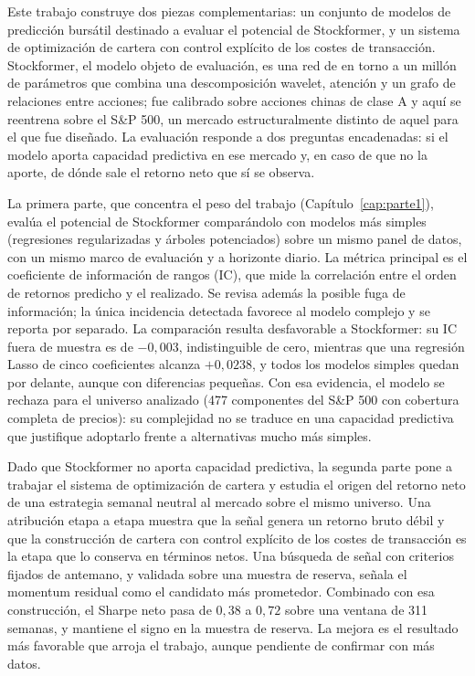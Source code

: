 Este trabajo construye dos piezas complementarias: un conjunto de modelos de predicción
bursátil destinado a evaluar el potencial de Stockformer, y un sistema de optimización de
cartera con control explícito de los costes de transacción. Stockformer, el modelo objeto
de evaluación, es una red de en torno a un millón de parámetros que combina una
descomposición wavelet, atención y un grafo de relaciones entre acciones; fue calibrado
sobre acciones chinas de clase A y aquí se reentrena sobre el S\&P 500, un mercado
estructuralmente distinto de aquel para el que fue diseñado. La evaluación responde a dos
preguntas encadenadas: si el modelo aporta capacidad predictiva en ese mercado y, en caso
de que no la aporte, de dónde sale el retorno neto que sí se observa.

La primera parte, que concentra el peso del trabajo (Capítulo~\ref{cap:parte1}), evalúa
el potencial de Stockformer comparándolo con modelos más simples (regresiones
regularizadas y árboles potenciados) sobre un mismo panel de datos, con un mismo marco de
evaluación y a horizonte diario. La métrica principal es el coeficiente de información de
rangos (IC), que mide la correlación entre el orden de retornos predicho y el realizado.
Se revisa además la posible fuga de información; la única incidencia detectada favorece
al modelo complejo y se reporta por separado. La comparación resulta desfavorable a
Stockformer: su IC fuera de muestra es de $-0{,}003$, indistinguible de cero, mientras
que una regresión Lasso de cinco coeficientes alcanza $+0{,}0238$, y todos los modelos
simples quedan por delante, aunque con diferencias pequeñas. Con esa evidencia, el modelo
se rechaza para el universo analizado (477 componentes del S\&P 500 con cobertura
completa de precios): su complejidad no se traduce en una capacidad predictiva que
justifique adoptarlo frente a alternativas mucho más simples.

Dado que Stockformer no aporta capacidad predictiva, la segunda parte pone a trabajar el
sistema de optimización de cartera y estudia el origen del retorno neto de una estrategia
semanal neutral al mercado sobre el mismo universo. Una atribución etapa a etapa muestra que la señal genera
un retorno bruto débil y que la construcción de cartera con control explícito de los
costes de transacción es la etapa que lo conserva en términos netos. Una búsqueda de señal
con criterios fijados de antemano, y validada sobre una muestra de reserva, señala el
momentum residual como el candidato más prometedor. Combinado con esa construcción, el
Sharpe neto pasa de $0{,}38$ a $0{,}72$ sobre una ventana de 311 semanas, y mantiene el
signo en la muestra de reserva. La mejora es el resultado más favorable que arroja el trabajo, aunque pendiente de
confirmar con más datos.


